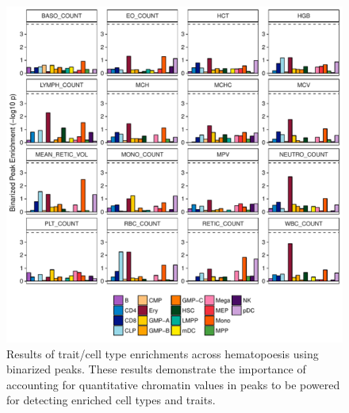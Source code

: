 \documentclass{article}\usepackage[]{graphicx}\usepackage[]{color}
\makeatletter
\def\maxwidth{ %
  \ifdim\Gin@nat@width>\linewidth
    \linewidth
  \else
    \Gin@nat@width
  \fi
}
\newenvironment{knitrout}{}{} %
\makeatother
\begin{document}
\begin{knitrout}
\color{fgcolor}\begin{figure}[H]

{\centering \includegraphics[width=\maxwidth]{figure/binarizedPeakPlot-1} 

}

\caption[Results of trait/cell type enrichments across hematopoesis using binarized peaks]{Results of trait/cell type enrichments across hematopoesis using binarized peaks. These results demonstrate the importance of accounting for quantitative chromatin values in peaks to be powered for detecting enriched cell types and traits.}\label{fig:binarizedPeakPlot}
\end{figure}


\end{knitrout}
\end{document}
